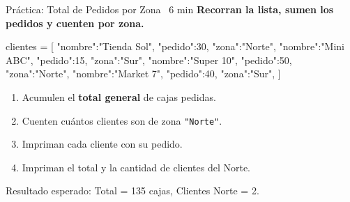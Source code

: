 \documentclass[aspectratio=169, 11pt]{beamer}
\begin{document}
\begin{frame}[fragile,shrink=30]{Práctica: Total de Pedidos por Zona \hfill
    {\normalsize\color{arcaRed}\faClock\ 6 min}}
  \vspace{-6pt}
  {\small\color{arcaDark}\bfseries
    Recorran la lista, sumen los pedidos y cuenten por zona.}

  \vspace{4pt}
  \begin{pyblock}
clientes = [
  {"nombre":"Tienda Sol", "pedido":30, "zona":"Norte"},
  {"nombre":"Mini ABC",   "pedido":15, "zona":"Sur"},
  {"nombre":"Super 10",   "pedido":50, "zona":"Norte"},
  {"nombre":"Market 7",   "pedido":40, "zona":"Sur"},
]
  \end{pyblock}

  \vspace{3pt}
  {\footnotesize
  \begin{enumerate}\setlength{\itemsep}{3pt}
    \item Acumulen el \textbf{total general} de cajas pedidas.
    \item Cuenten cuántos clientes son de zona \texttt{"Norte"}.
    \item Impriman cada cliente con su pedido.
    \item Impriman el total y la cantidad de clientes del Norte.
  \end{enumerate}
  }

  \vspace{3pt}
  {\scriptsize\color{textMuted}
    Resultado esperado: Total = 135 cajas, Clientes Norte = 2.}
\end{frame}
\end{document}
